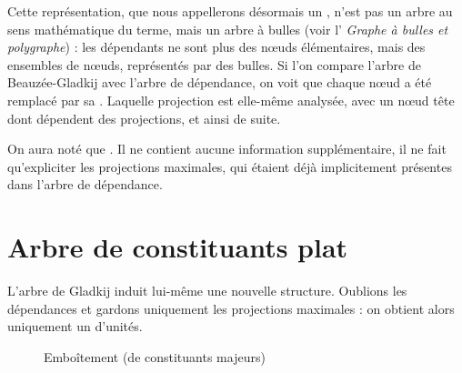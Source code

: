Cette représentation, que nous appellerons désormais un , n’est pas un arbre au sens mathématique du terme, mais un arbre à bulles (voir l’ \textit{Graphe à bulles et polygraphe}) : les dépendants ne sont plus des nœuds élémentaires, mais des ensembles de nœuds, représentés par des bulles. Si l’on compare l’arbre de Beauzée-Gladkij avec l’arbre de dépendance, on voit que chaque nœud a été remplacé par sa . Laquelle projection est elle-même analysée, avec un nœud tête dont dépendent des projections, et ainsi de suite.

On aura noté que    . Il ne contient aucune information supplémentaire, il ne fait qu’expliciter les projections maximales, qui étaient déjà implicitement présentes dans l’arbre de dépendance.

\section{Arbre de constituants plat}\label{sec:3.4.2}

L’arbre de Gladkij induit lui-même une nouvelle structure. Oublions les dépendances et gardons uniquement les projections maximales : on obtient alors uniquement un  d’unités. 

\begin{figure}

\caption{\label{fig:laponie-box}Emboîtement (de constituants majeurs)}
\end{figure}

